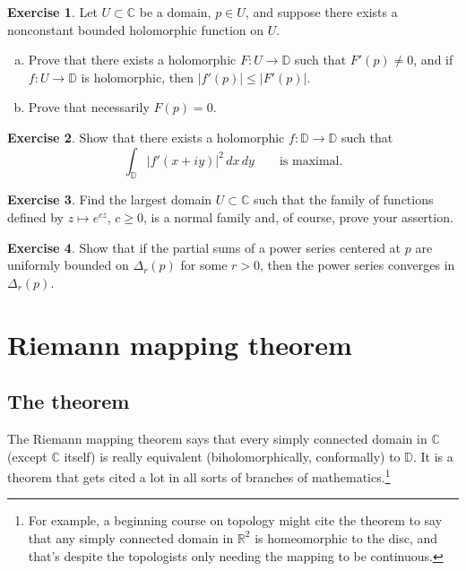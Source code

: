 \documentclass[12pt,openany]{book}
\newcommand{\sabs}[1]{\lvert {#1} \rvert}
\newcommand{\abs}[1]{\left\lvert {#1} \right\rvert}
\newcommand{\C}{{\mathbb{C}}}
\newcommand{\R}{{\mathbb{R}}}
\newcommand{\D}{{\mathbb{D}}}
\theoremstyle{plain}
\theoremstyle{remark}
\theoremstyle{definition}
\newenvironment{exbox}{%
    \def\FrameCommand{\vrule width 1pt \relax\hspace{10pt}}%
    \MakeFramed{\advance\hsize-\width\FrameRestore}%
}{%
    \endMakeFramed
}
\newenvironment{exparts}{%
    \leavevmode\begin{enumerate}[a),noitemsep,topsep=0pt,parsep=0pt,partopsep=0pt]
}{%
    \end{enumerate}
}
\theoremstyle{exercise}
\newtheorem{exercise}{Exercise}[section]
\theoremstyle{example}
\begin{document}
\begin{exbox}
\begin{exercise}
Let $U \subset \C$ be a domain, $p \in U$,
and suppose there exists a nonconstant
bounded holomorphic function on $U$.
\begin{exparts}
\item
Prove that there exists a holomorphic $F \colon U \to \D$
such that
$F'(p) \not= 0$, and if
$f \colon U \to \D$ is holomorphic,
then $\sabs{f'(p)} \leq \sabs{F'(p)}$.
\item
Prove that necessarily $F(p) = 0$.
\end{exparts}
\end{exercise}

\begin{exercise}
Show that there exists
a holomorphic $f \colon \D \to \D$ such that
\begin{equation*}
\int_{\D} \abs{f'(x+iy)}^2 \, dx \, dy
\qquad \text{is maximal.}
\end{equation*}
\end{exercise}

\begin{exercise}
Find the largest domain $U \subset \C$ such that the family
of functions defined by $z \mapsto e^{cz}$, $c \geq 0$, is a
normal family and, of course, prove your assertion.
\end{exercise}

\begin{exercise}
Show that if the partial sums of a power series centered at $p$
are uniformly bounded on $\Delta_r(p)$ for some $r > 0$,
then the power series converges in $\Delta_r(p)$.
\end{exercise}
\end{exbox}


\section{Riemann mapping theorem}
\label{sec:RMT}

\subsection{The theorem}

The Riemann mapping theorem says that
every simply connected domain in $\C$ (except $\C$ itself) is really
equivalent (biholomorphically, conformally) to $\D$.
It is a theorem that gets cited a lot in all sorts of branches of
mathematics.\footnote{For example, a beginning course on topology might cite
the theorem to say that any simply connected domain in $\R^2$
is homeomorphic to the disc, and that's despite the topologists only
needing the mapping to be continuous.}
\end{document}
